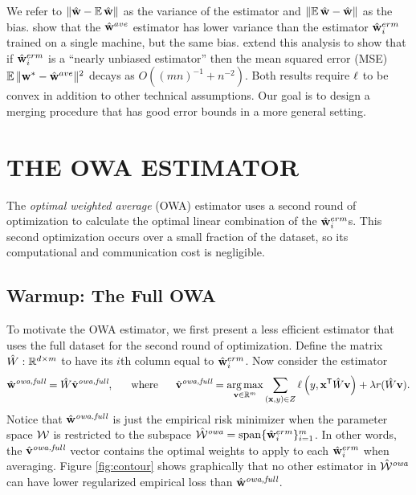 \documentclass[thesis.tex]{subfiles}
\begin{document}
We refer to ${\lVert {{\hat{\mathbf w}}-\operatorname*{\mathbb E}{\hat{\mathbf w}}} \rVert}$ as the variance of the estimator and ${\lVert {\operatorname*{\mathbb E}{\hat{\mathbf w}}-{\hat{\mathbf w}}} \rVert}$ as the bias.
\citet{mcdonald2009efficient} show that the $\hat{\mathbf w}^{ave}$ estimator has lower variance than the estimator $\hat{\mathbf w}^{erm}_i$ trained on a single machine, but the same bias.
\citet{zhang2012communication} extend this analysis to show that if $\hat{\mathbf w}^{erm}_i$ is a ``nearly unbiased estimator'' then the mean squared error (MSE) $\operatorname*{\mathbb E}{\lVert {{\mathbf w^{*}}-\hat{\mathbf w}^{ave}} \rVert}{}^2$ decays as $O((mn)^{-1} + n^{-2})$.
Both results require $\ell$ to be convex in addition to other technical assumptions.
Our goal is to design a merging procedure that has good error bounds in a more general setting.


\vspace{-0.1in}
\section{THE OWA ESTIMATOR}

\vspace{-0.05in}
The \emph{optimal weighted average} (OWA) estimator uses a second round of optimization to calculate the optimal linear combination of the $\hat{\mathbf w}^{erm}_i$s.
This second optimization occurs over a small fraction of the dataset,
so its computational and communication cost is negligible.

\subsection{Warmup: The Full OWA}

To motivate the OWA estimator,
we first present a less efficient estimator that uses the full dataset for the second round of optimization.
Define the matrix $\hat W : \mathbb{R}^{d\times m}$ to have its $i$th column equal to $\hat{\mathbf w}^{erm}_i$. 
Now consider the estimator
\begin{equation}
\hat{\mathbf w}^{\textit{owa,full}} = \hat W \hat{\mathbf{v}}^{\textit{owa,full}}
,
\text{~~~~~where~~~~~}
\label{eq:vfull}
\hat{\mathbf{v}}^{\textit{owa,full}} = \operatorname*{arg\,max}_{\mathbf{v}\in\mathbb R^m} \sum _{(\mathbf{x},y)\in Z} \ell\left(y,{\mathbf{x}}^{\mathsf{T}} \hat W \mathbf{v} \right)
+
\lambda r(\hat W\mathbf{v})
.
\end{equation}
Notice that $\hat{\mathbf w}^{\textit{owa,full}}$ is just the empirical risk minimizer when the parameter space ${\mathcal W}$ is restricted to the subspace ${\hat {{\mathcal W}}^{\textit{owa}}}=\operatorname*{span}\{\hat{\mathbf w}^{erm}_i\}_{i=1}^m$.
In other words, the $\hat{\mathbf{v}}^{\textit{owa,full}}$ vector contains the optimal weights to apply to each $\hat{\mathbf w}^{erm}_i$ when averaging.
Figure \ref{fig:contour} shows graphically that no other estimator in ${\hat {{\mathcal W}}^{\textit{owa}}}$ can have lower regularized empirical loss than $\hat{\mathbf w}^{\textit{owa,full}}$.
\end{document}
